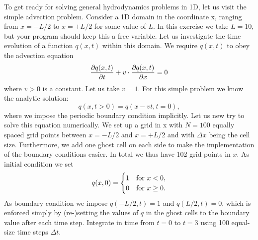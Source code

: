 To get ready for solving general hydrodynamics problems 
in 1D, let us visit the simple advection problem. Consider 
a 1D domain in the coordinate x, ranging from $x=-L/2$ to 
$x=+L/2$ for some value of $L$. 
In this exercise we take $L=10$, but your program should 
keep this a free variable. Let us investigate the time 
evolution of a function $q(x, t)$ within this domain. We 
require $q(x, t)$ to obey the advection equation
\begin{equation}
    \frac{\partial q(x,t)}{\partial t}+v\cdot\frac{\partial q(x,t)}{\partial x}=0
\end{equation}
where $v>0$ is a constant. Let us take $v=1$. For this 
simple problem we know the analytic solution: 
\begin{equation}
    q(x, t>0) = q(x-vt, t=0),
\end{equation}
where we impose the periodic boundary condition implicitly. 
Let us new try to solve this equation numerically. We set 
up a grid in x with $N=100$ equally spaced grid points 
between $x=-L/2$ and $x=+L/2$ and with $\Delta x$ being the 
cell size. Furthermore, we add one ghost cell on each side 
to make the implementation of the boundary conditions 
easier.  In total we thus have 102 grid points in $x$. 
As initial condition we set
\begin{equation}
    q(x,0)=
    \begin{cases}
        1 &  \textnormal{for }x<0, \\
        0 &  \textnormal{for }x\geq0.
    \end{cases}
\end{equation}
As boundary condition we impose $q(-L/2, t)=1$ and 
$q(L/2,t)=0$, which is enforced simply by (re-)setting the 
values of $q$ in the ghost cells to the boundary value 
after each time step. Integrate in time from $t=0$ to 
$t=3$ using 100 equal-size time steps $\Delta t$.

